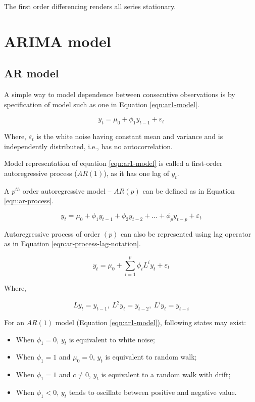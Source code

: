 \documentclass[
  12pt,
]{article}
\providecommand{\tightlist}{%
  \setlength{\itemsep}{0pt}\setlength{\parskip}{0pt}}
\begin{document}
The first order differencing renders all series stationary.

\hypertarget{arima-model}{%
\section{ARIMA model}\label{arima-model}}

\hypertarget{ar-model}{%
\subsection{AR model}\label{ar-model}}

A simple way to model dependence between consecutive observations is by specification of model such as one in Equation \ref{eqn:ar1-model}.

\begin{equation}
\label{eqn:ar1-model}
y_t = \mu_0 + \phi_1 y_{t-1} + \varepsilon_t
\end{equation}

Where, \(\varepsilon_t\) is the white noise having constant mean and variance and is independently distributed, i.e., has no autocorrelation.

Model representation of equation \ref{eqn:ar1-model} is called a first-order autoregressive process (\(AR(1)\)), as it has one lag of \(y_t\).

A \(p^{th}\) order autoregressive model -- \(AR(p)\) can be defined as in Equation \ref{eqn:ar-process}.

\begin{equation}
\label{eqn:ar-process}
y_t = \mu_0 + \phi_1 y_{t-1} + \phi_2 y_{t-2} + ... + \phi_p y_{t - p} + \varepsilon_t
\end{equation}

Autoregressive process of order \((p)\) can also be represented using lag operator as in Equation \ref{eqn:ar-process-lag-notation}.

\begin{equation}
\label{eqn:ar-process-lag-notation}
y_t = \mu_0 + \sum_{i = 1}^{p}{\phi_i L^i y_t} + \varepsilon_t
\end{equation}

Where,

\[
L y_t = y_{t-1},\ L^2 y_t = y_{t-2},\ L^iy_t = y_{t-i}
\]

For an \(AR(1)\) model (Equation \ref{eqn:ar1-model}), following states may exist:

\begin{itemize}
\tightlist
\item
  When \(\phi_1 = 0\), \(y_t\) is equivalent to white noise;
\item
  When \(\phi_1 = 1\) and \(\mu_0 = 0\), \(y_t\) is equivalent to random walk;
\item
  When \(\phi_1 = 1\) and \(c \neq 0\), \(y_t\) is equivalent to a random walk with drift;
\item
  When \(\phi_1 < 0\), \(y_t\) tends to oscillate between positive and negative value.
\end{itemize}
\end{document}
